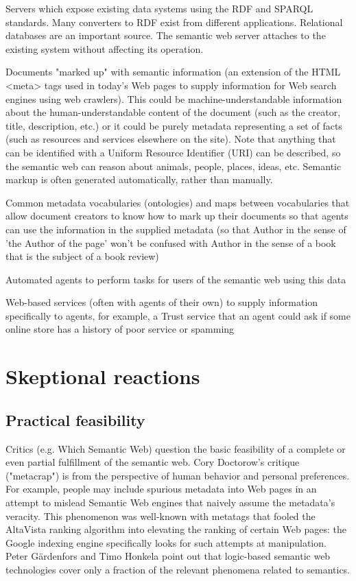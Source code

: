 \begin{compactitem}
\item Servers which expose existing data systems using the RDF and SPARQL standards. Many converters to RDF exist from different applications. Relational databases are an important source. The semantic web server attaches to the existing system without affecting its operation.
\item Documents "marked up" with semantic information (an extension of the HTML <meta> tags used in today's Web pages to supply information for Web search engines using web crawlers). This could be machine-understandable information about the human-understandable content of the document (such as the creator, title, description, etc.) or it could be purely metadata representing a set of facts (such as resources and services elsewhere on the site). Note that anything that can be identified with a Uniform Resource Identifier (URI) can be described, so the semantic web can reason about animals, people, places, ideas, etc. Semantic markup is often generated automatically, rather than manually.
\item Common metadata vocabularies (ontologies) and maps between vocabularies that allow document creators to know how to mark up their documents so that agents can use the information in the supplied metadata (so that Author in the sense of 'the Author of the page' won't be confused with Author in the sense of a book that is the subject of a book review)
\item Automated agents to perform tasks for users of the semantic web using this data
\item Web-based services (often with agents of their own) to supply information specifically to agents, for example, a Trust service that an agent could ask if some online store has a history of poor service or spamming
\end{compactitem}




\section{Skeptional reactions}


\subsection{Practical feasibility}

Critics (e.g. Which Semantic Web) question the basic feasibility of a complete or even partial fulfillment of the semantic web. Cory Doctorow's critique ("metacrap") is from the perspective of human behavior and personal preferences. For example, people may include spurious metadata into Web pages in an attempt to mislead Semantic Web engines that naively assume the metadata's veracity. This phenomenon was well-known with metatags that fooled the AltaVista ranking algorithm into elevating the ranking of certain Web pages: the Google indexing engine specifically looks for such attempts at manipulation. Peter Gärdenfors and Timo Honkela point out that logic-based semantic web technologies cover only a fraction of the relevant phenomena related to semantics.

